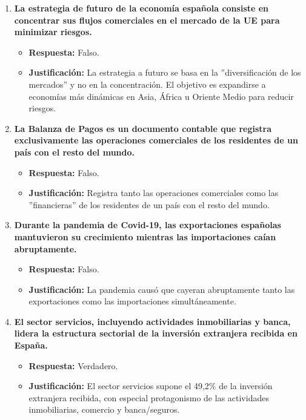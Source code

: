 \begin{enumerate}[label=\textbf{Pregunta \arabic*:}, leftmargin=*, itemsep=4ex]
\item \textbf{La estrategia de futuro de la economía española consiste en concentrar sus flujos comerciales en el mercado de la UE para minimizar riesgos.}
    \begin{itemize}
        \item \textbf{Respuesta:} \textcolor{red!80!black}{Falso.}
        \item \textbf{Justificación:} La estrategia a futuro se basa en la ''diversificación de los mercados'' y no en la concentración. El objetivo es expandirse a economías más dinámicas en Asia, África u Oriente Medio para reducir riesgos.
    \end{itemize}

\item \textbf{La Balanza de Pagos es un documento contable que registra exclusivamente las operaciones comerciales de los residentes de un país con el resto del mundo.}
    \begin{itemize}
        \item \textbf{Respuesta:} \textcolor{red!80!black}{Falso.}
        \item \textbf{Justificación:} Registra tanto las operaciones comerciales como las ''financieras'' de los residentes de un país con el resto del mundo.
    \end{itemize}

\item \textbf{Durante la pandemia de Covid-19, las exportaciones españolas mantuvieron su crecimiento mientras las importaciones caían abruptamente.}
    \begin{itemize}
        \item \textbf{Respuesta:} \textcolor{red!80!black}{Falso.}
        \item \textbf{Justificación:} La pandemia causó que cayeran abruptamente tanto las exportaciones como las importaciones simultáneamente.
    \end{itemize}

\item \textbf{El sector servicios, incluyendo actividades inmobiliarias y banca, lidera la estructura sectorial de la inversión extranjera recibida en España.}
    \begin{itemize}
        \item \textbf{Respuesta:} \textcolor{blue!80!black}{Verdadero.}
        \item \textbf{Justificación:} El sector servicios supone el 49,2\% de la inversión extranjera recibida, con especial protagonismo de las actividades inmobiliarias, comercio y banca/seguros.
    \end{itemize}


\end{enumerate}
